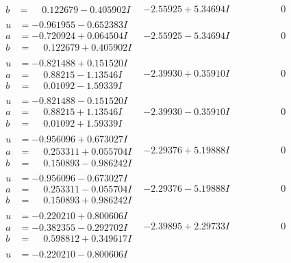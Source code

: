 \documentclass[1p]{elsarticle_modified}
\theoremstyle{definition}
\begin{document}
$$\begin{array}{c|c|c}
\begin{aligned}
b &= \phantom{-}0.122679 - 0.405902 I\end{aligned}
 & -2.55925 + 5.34694 I & \phantom{-0.000000 } 0 \\ \hline\begin{aligned}
u &= -0.961955 - 0.652383 I \\
a &= -0.720924 + 0.064504 I \\
b &= \phantom{-}0.122679 + 0.405902 I\end{aligned}
 & -2.55925 - 5.34694 I & \phantom{-0.000000 } 0 \\ \hline\begin{aligned}
u &= -0.821488 + 0.151520 I \\
a &= \phantom{-}0.88215 - 1.13546 I \\
b &= \phantom{-}0.01092 - 1.59339 I\end{aligned}
 & -2.39930 + 0.35910 I & \phantom{-0.000000 } 0 \\ \hline\begin{aligned}
u &= -0.821488 - 0.151520 I \\
a &= \phantom{-}0.88215 + 1.13546 I \\
b &= \phantom{-}0.01092 + 1.59339 I\end{aligned}
 & -2.39930 - 0.35910 I & \phantom{-0.000000 } 0 \\ \hline\begin{aligned}
u &= -0.956096 + 0.673027 I \\
a &= \phantom{-}0.253311 + 0.055704 I \\
b &= \phantom{-}0.150893 - 0.986242 I\end{aligned}
 & -2.29376 + 5.19888 I & \phantom{-0.000000 } 0 \\ \hline\begin{aligned}
u &= -0.956096 - 0.673027 I \\
a &= \phantom{-}0.253311 - 0.055704 I \\
b &= \phantom{-}0.150893 + 0.986242 I\end{aligned}
 & -2.29376 - 5.19888 I & \phantom{-0.000000 } 0 \\ \hline\begin{aligned}
u &= -0.220210 + 0.800606 I \\
a &= -0.382355 - 0.292702 I \\
b &= \phantom{-}0.598812 + 0.349617 I\end{aligned}
 & -2.39895 + 2.29733 I & \phantom{-0.000000 } 0 \\ \hline\begin{aligned}
u &= -0.220210 - 0.800606 I \\

\end{aligned}
\end{array}$$
\end{document}
